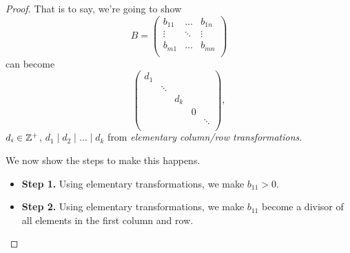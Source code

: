\begin{proof}
	That is to say, we're going to show
	\[
		B = \begin{pmatrix}
			b_{11} & \ldots & b_{1n} \\
			\vdots & \ddots & \vdots \\
			b_{m1} & \ldots & b_{mn} \\
		\end{pmatrix}
	\]
	can become
	\[
		\begin{pmatrix}
			d_1 &        &       &   &        \\
			    & \ddots &       &   &        \\
			    &        & d_{k} &   &        \\
			    &        &       & 0 &        \\
			    &        &       &   & \ddots \\
		\end{pmatrix},
	\]
	\(d_{i} \in \mathbb{\MakeUppercase{z}} ^+\), \(d_1\mid d_2 \mid \ldots \mid d_k \) from \emph{elementary column/row transformations}.

	We now show the steps to make this happens.
	\begin{itemize}
		\item \textbf{Step 1.} Using elementary transformations, we make \(b_{11} >0 \).
		\item \textbf{Step 2.} Using elementary transformations, we make \(b_{11}\) become a divisor of all elements in the first column and row.


\end{itemize}
\end{proof}
